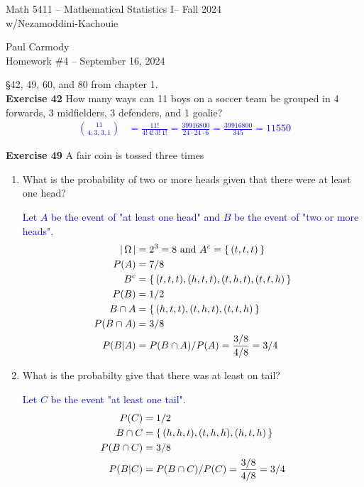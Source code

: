 \documentclass[10pt,a4paper]{report}
\newcommand{\CLASSNAME}{Math 5411 -- Mathematical Statistics I}
\newcommand{\PROFESSOR}{Nezamoddini-Kachouie}
\newcommand{\STUDENTNAME}{Paul Carmody}
\newcommand{\ASSIGNMENT}{Homework \#4 }
\newcommand{\DUEDATE}{September 16, 2024}
\newcommand{\SEMESTER}{Fall 2024}
\newcommand{\BLUE}[1]{\textcolor{blue}{#1}}
\begin{document}
\begin{center}
	\Large{\CLASSNAME -- \SEMESTER} \\
	\large{w/\PROFESSOR}
\end{center}
\begin{center}
	\STUDENTNAME \\
	\ASSIGNMENT -- \DUEDATE\\
\end{center}

\S 42, 49, 60, and 80 from chapter 1.\\

\noindent\textbf{Exercise 42} How many ways can 11 boys on a soccer team be grouped in 4 forwards, 3 midfielders, 3 defenders, and 1 goalie?\\
\BLUE{
\begin{align*}
	\binom{11}{4,3,3,1} &= \frac{11!}{4!\,4!\,3!\,1!} = \frac{39916800}{24\cdot 24 \cdot 6} = \frac{39916800}{345}= 11550
\end{align*}
}

\noindent\textbf{Exercise 49} A fair coin is tossed three times
\begin{enumerate}
	\item What is the probability of two or more heads given that there were at least one head?
	
	\BLUE{Let $A$ be the event of "at least one head" and $B$ be the event of "two or more heads".\begin{align*}
		\left |\, \Omega \,\right | &= 2^3 = 8 \text{ and } A^c = \left \{\,  (t,t,t)  \,\right \}\\
		P(A) &= 7/8\\
		B^c &= \left \{\,  (t,t,t), (h,t,t), (t,h,t), (t,t,h) \,\right \}\\
		P(B) &= 1/2 \\
		B \cap A &= \left \{\,  (h,t,t), (t,h,t), (t,t,h) \,\right \}\\
		P(B\cap A) &= 3/8\\
		P(B|A) &= P(B \cap A)/P(A) = \frac{3/8}{4/8} = 3/4
	\end{align*} }
	
	\item What is the probabilty give that there was at least on tail?
	
	\BLUE{Let $C$ be the event "at least one tail".
	\begin{align*}
		P(C) &= 1/2 \\
		B\cap C &= \left \{\,  (h,h,t), (t,h,h), (h,t,h)  \,\right \}\\
		P(B \cap C) &= 3/8\\
		P(B|C) &= P(B \cap C)/P(C) = \frac{3/8}{4/8} = 3/4
	\end{align*}
	}
\end{enumerate}
\end{document}
